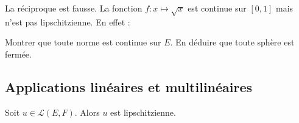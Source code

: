 \documentclass[a4paper,10pt]{report}
\begin{document}
\begin{Remarque}{} La réciproque est fausse. La fonction $f : x \mapsto \sqrt{x}$ est continue sur $[0,1]$ mais n'est pas lipschitzienne. En effet :

\vspace{6cm}
\end{Remarque}

\begin{ApplicationDirecte} Montrer que toute norme est continue sur $E$. En déduire que toute sphère est fermée.
\end{ApplicationDirecte}

\subsection{Applications linéaires et multilinéaires}

\begin{Theoreme}{} Soit $u \in \mathcal{L}(E,F)$. Alors $u$ est lipschitzienne.
\end{Theoreme}

\begin{Demonstration}{} 

\vspace{9cm}
\end{Demonstration}
\end{document}
